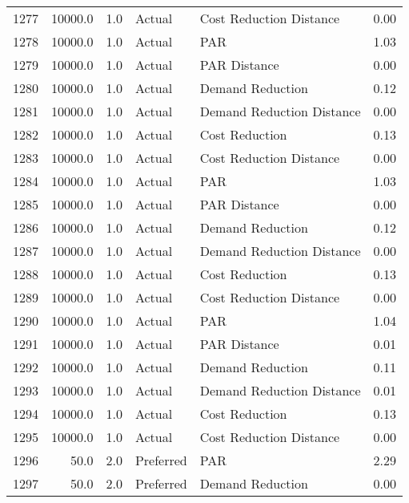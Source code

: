 \begin{longtable}{lrrllr}
1277 &      10000.0 &     1.0 &         Actual &    Cost Reduction Distance &   0.00 \\
1278 &      10000.0 &     1.0 &         Actual &                        PAR &   1.03 \\
1279 &      10000.0 &     1.0 &         Actual &               PAR Distance &   0.00 \\
1280 &      10000.0 &     1.0 &         Actual &           Demand Reduction &   0.12 \\
1281 &      10000.0 &     1.0 &         Actual &  Demand Reduction Distance &   0.00 \\
1282 &      10000.0 &     1.0 &         Actual &             Cost Reduction &   0.13 \\
1283 &      10000.0 &     1.0 &         Actual &    Cost Reduction Distance &   0.00 \\
1284 &      10000.0 &     1.0 &         Actual &                        PAR &   1.03 \\
1285 &      10000.0 &     1.0 &         Actual &               PAR Distance &   0.00 \\
1286 &      10000.0 &     1.0 &         Actual &           Demand Reduction &   0.12 \\
1287 &      10000.0 &     1.0 &         Actual &  Demand Reduction Distance &   0.00 \\
1288 &      10000.0 &     1.0 &         Actual &             Cost Reduction &   0.13 \\
1289 &      10000.0 &     1.0 &         Actual &    Cost Reduction Distance &   0.00 \\
1290 &      10000.0 &     1.0 &         Actual &                        PAR &   1.04 \\
1291 &      10000.0 &     1.0 &         Actual &               PAR Distance &   0.01 \\
1292 &      10000.0 &     1.0 &         Actual &           Demand Reduction &   0.11 \\
1293 &      10000.0 &     1.0 &         Actual &  Demand Reduction Distance &   0.01 \\
1294 &      10000.0 &     1.0 &         Actual &             Cost Reduction &   0.13 \\
1295 &      10000.0 &     1.0 &         Actual &    Cost Reduction Distance &   0.00 \\
1296 &         50.0 &     2.0 &      Preferred &                        PAR &   2.29 \\
1297 &         50.0 &     2.0 &      Preferred &           Demand Reduction &   0.00 \\

\end{longtable}
